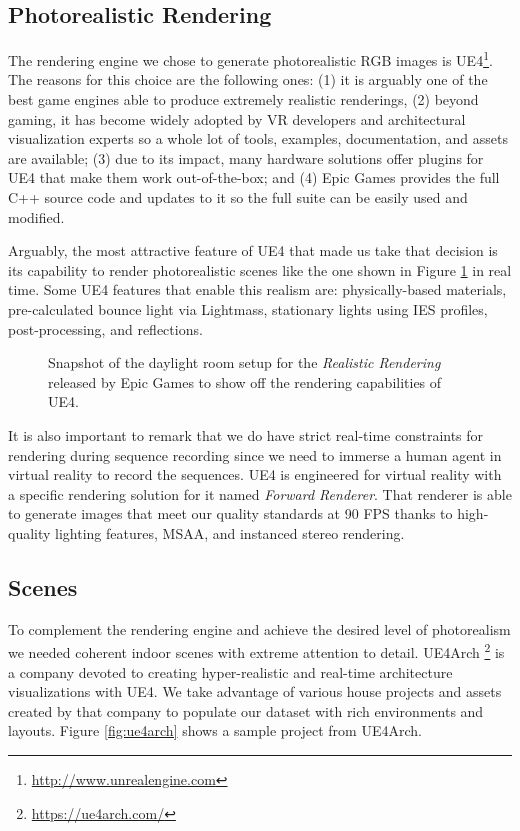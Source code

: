 \subsection{Photorealistic Rendering}

The rendering engine we chose to generate photorealistic RGB images is \acf{UE4}\footnote{\url{http://www.unrealengine.com}}. The reasons for this choice are the following ones: (1) it is arguably one of the best game engines able to produce extremely realistic renderings, (2) beyond gaming, it has become widely adopted by VR developers and architectural visualization experts so a whole lot of tools, examples, documentation, and assets are available; (3) due to its impact, many hardware solutions offer plugins for \ac{UE4} that make them work out-of-the-box; and (4) Epic Games provides the full C++ source code and updates to it so the full suite can be easily used and modified.

Arguably, the most attractive feature of \ac{UE4} that made us take that decision is its capability to render photorealistic scenes like the one shown in Figure \ref{fig:realistic_rendering} in real time. Some \ac{UE4} features that enable this realism are: physically-based materials, pre-calculated bounce light via Lightmass, stationary lights using IES profiles, post-processing, and reflections.

\begin{figure}[!hbt]
  \centering
  \caption{Snapshot of the daylight room setup for the \emph{Realistic Rendering} released by Epic Games to show off the rendering capabilities of \ac{UE4}.}
  \label{fig:realistic_rendering}
\end{figure}

It is also important to remark that we do have strict real-time constraints for rendering during sequence recording since we need to immerse a human agent in virtual reality to record the sequences. \ac{UE4} is engineered for virtual reality with a specific rendering solution for it named \emph{Forward Renderer}. That renderer is able to generate images that meet our quality standards at 90 \ac{FPS} thanks to high-quality lighting features, \ac{MSAA}, and instanced stereo rendering.

\subsection{Scenes}

To complement the rendering engine and achieve the desired level of photorealism we needed coherent indoor scenes with extreme attention to detail. UE4Arch \footnote{\url{https://ue4arch.com/}} is a company devoted to creating hyper-realistic and real-time architecture visualizations with \ac{UE4}. We take advantage of various house projects and assets created by that company to populate our dataset with rich environments and layouts. Figure \ref{fig:ue4arch} shows a sample project from UE4Arch.

